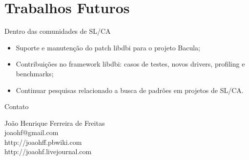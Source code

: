 \section{Trabalhos Futuros}
  \begin{frame}{Dentro das comunidades de SL/CA}
    \begin{itemize}
      \item Suporte e manutenção do patch libdbi para o projeto Bacula;
      \item Contribuições no framework libdbi: casos de testes, novos drivers, profiling e benchmarks;
      \item Continuar pesquisas relacionado a busca de padrões em projetos de SL/CA.
    \end{itemize}
  \end{frame}

  \begin{frame}{Contato}
    \begin{center}
     \begin{Large}
João Henrique Ferreira de Freitas \\
joaohf@gmail.com \\ 
\vspace{1cm}
http://joaohff.pbwiki.com \\
http://joaohf.livejournal.com
      \end{Large}
    \end{center}
  \end{frame}


